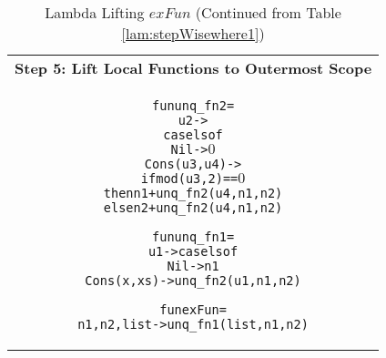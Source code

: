 \documentclass[11pt]{article}
\begin{document}
\begin{table}
\begin{center}
\begin{tabular}{|c|}
\begin{minipage}{4in}
\begin{alltt}
\end{alltt} 
\end {minipage}\\ 
\hline 
{\bf Step 5: Lift Local Functions to Outermost Scope}\\ 
\hline 
\begin{minipage}{4in}
\begin{alltt}


  fun unq_fn2 =
    u2 -> 
      case ls of
        Nil -> \(0\)
        Cons(u3,u4) ->
          if mod(u3,2) == \(0\) 
            then n1 + unq_fn2(u4,n1,n2)
            else n2 + unq_fn2(u4,n1,n2) 

  fun unq_fn1 = 
    u1 -> case ls of 
            Nil -> n1
            Cons(x,xs) -> unq_fn2(u1,n1,n2)

  fun exFun = 
    n1,n2,list -> unq_fn1(list,n1,n2)

\end{alltt} 
\end {minipage}
\tabularnewline
\hline
\end{tabular}
\caption{Lambda Lifting $exFun$ (Continued from Table \ref {lam:stepWisewhere1})}
\label{lam:stepWisewhere2}
\end{center}
\end{table}
\end{document}
